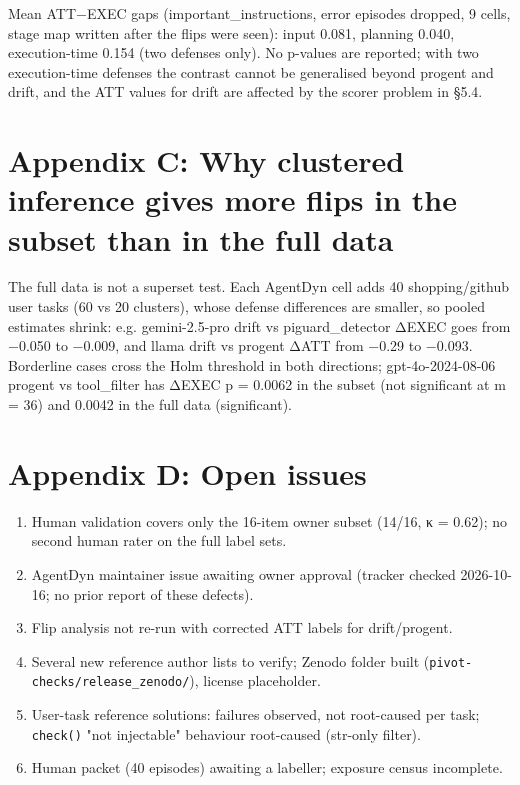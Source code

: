 \documentclass[10pt]{article}
\providecommand{\tightlist}{\setlength{\itemsep}{0pt}\setlength{\parskip}{0pt}}
\begin{document}
Mean ATT−EXEC gaps (important\_instructions, error episodes dropped, 9 cells, stage map written after the flips were seen): input 0.081, planning 0.040, execution-time 0.154 (two defenses only). No p-values are reported; with two execution-time defenses the contrast cannot be generalised beyond progent and drift, and the ATT values for drift are affected by the scorer problem in §5.4.

\section{Appendix C: Why clustered inference gives more flips in the subset than in the full data}\label{appendix-c-why-clustered-inference-gives-more-flips-in-the-subset-than-in-the-full-data}

The full data is not a superset test. Each AgentDyn cell adds 40 shopping/github user tasks (60 vs 20 clusters), whose defense differences are smaller, so pooled estimates shrink: e.g. gemini-2.5-pro drift vs piguard\_detector ΔEXEC goes from −0.050 to −0.009, and llama drift vs progent ΔATT from −0.29 to −0.093. Borderline cases cross the Holm threshold in both directions; gpt-4o-2024-08-06 progent vs tool\_filter has ΔEXEC p = 0.0062 in the subset (not significant at m = 36) and 0.0042 in the full data (significant).

\section{Appendix D: Open issues}\label{appendix-d-open-issues}

\begin{enumerate}
\def\labelenumi{\arabic{enumi}.}
\tightlist
\item
  Human validation covers only the 16-item owner subset (14/16, κ = 0.62); no second human rater on the full label sets.
\item
  AgentDyn maintainer issue awaiting owner approval (tracker checked 2026-10-16; no prior report of these defects).
\item
  Flip analysis not re-run with corrected ATT labels for drift/progent.
\item
  Several new reference author lists to verify; Zenodo folder built (\texttt{pivot-checks/\allowbreak{}release\_\allowbreak{}zenodo/\allowbreak{}}), license placeholder.
\item
  User-task reference solutions: failures observed, not root-caused per task; \texttt{check()} "not injectable" behaviour root-caused (str-only filter).
\item
  Human packet (40 episodes) awaiting a labeller; exposure census incomplete.
\end{enumerate}
\end{document}
